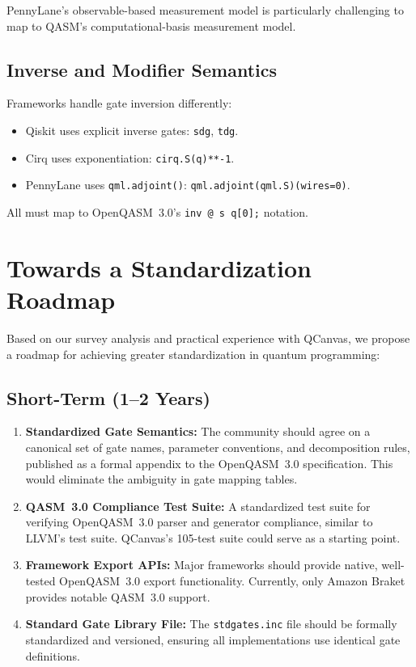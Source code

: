 \documentclass[journal]{IEEEtran}
\begin{document}
PennyLane's observable-based measurement model is particularly challenging to map to QASM's computational-basis measurement model.

\subsection{Inverse and Modifier Semantics}

Frameworks handle gate inversion differently:
\begin{itemize}
    \item Qiskit uses explicit inverse gates: \texttt{sdg}, \texttt{tdg}.
    \item Cirq uses exponentiation: \texttt{cirq.S(q)**-1}.
    \item PennyLane uses \texttt{qml.adjoint()}: \texttt{qml.adjoint(qml.S)(wires=0)}.
\end{itemize}

All must map to OpenQASM~3.0's \texttt{inv @ s q[0];} notation.

\section{Towards a Standardization Roadmap}
\label{sec:roadmap}

Based on our survey analysis and practical experience with QCanvas, we propose a roadmap for achieving greater standardization in quantum programming:

\subsection{Short-Term (1--2 Years)}

\begin{enumerate}
    \item \textbf{Standardized Gate Semantics:} The community should agree on a canonical set of gate names, parameter conventions, and decomposition rules, published as a formal appendix to the OpenQASM~3.0 specification. This would eliminate the ambiguity in gate mapping tables.

    \item \textbf{QASM~3.0 Compliance Test Suite:} A standardized test suite for verifying OpenQASM~3.0 parser and generator compliance, similar to LLVM's test suite. QCanvas's 105-test suite could serve as a starting point.

    \item \textbf{Framework Export APIs:} Major frameworks should provide native, well-tested OpenQASM~3.0 export functionality. Currently, only Amazon Braket provides notable QASM~3.0 support.

    \item \textbf{Standard Gate Library File:} The \texttt{stdgates.inc} file should be formally standardized and versioned, ensuring all implementations use identical gate definitions.
\end{enumerate}
\end{document}
